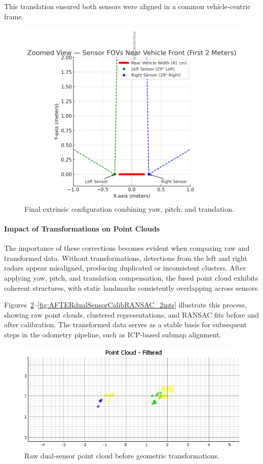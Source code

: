 This translation ensured both sensors were aligned in a common vehicle-centric frame.

\begin{figure}[!htbp]
    \centering
    \includegraphics[width=0.8\linewidth]{images/RotationSensor.png}
    \caption{Final extrinsic configuration combining yaw, pitch, and translation.}
    \label{fig:extrinsics}
\end{figure}

\vspace{2em}

\paragraph{Impact of Transformations on Point Clouds}
The importance of these corrections becomes evident when comparing raw and transformed data. Without transformations, detections from the left and right radars appear misaligned, producing duplicated or inconsistent clusters. After applying yaw, pitch, and translation compensation, the fused point cloud exhibits coherent structures, with static landmarks consistently overlapping across sensors.

Figures~\ref{fig:dualSensorCalib_2mts}--\ref{fig:AFTERdualSensorCalibRANSAC_2mts} illustrate this process, showing raw point clouds, clustered representations, and RANSAC fits before and after calibration. The transformed data serves as a stable basis for subsequent steps in the odometry pipeline, such as ICP-based submap alignment.

\begin{figure}[!htbp]
    \centering
    \includegraphics[width=0.9\linewidth]{images/dualSensorCalib_2mts.png}
    \caption{Raw dual-sensor point cloud before geometric transformations.}
    \label{fig:dualSensorCalib_2mts}
\end{figure}

